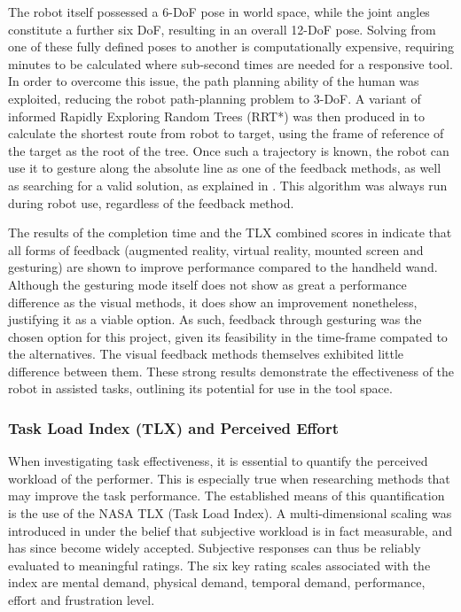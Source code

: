 \documentclass[11pt]{article}
\begin{document}
The robot itself possessed a 6-DoF pose in world space, while the joint angles constitute a further six DoF, resulting in an overall 12-DoF pose. Solving from one of these fully defined poses to another is computationally expensive, requiring minutes to be calculated where sub-second times are needed for a responsive tool. In order to overcome this issue, the path planning ability of the human was exploited, reducing the robot path-planning problem to 3-DoF. A variant of informed Rapidly Exploring Random Trees (RRT*) \cite{Gammell2014} was then produced in \cite{GreggSmithFeedback} to calculate the shortest route from robot to target, using the frame of reference of the target as the root of the tree. Once such a trajectory is known, the robot can use it to gesture along the absolute line as one of the feedback methods, as well as searching for a valid solution, as explained in \cite{GreggSmithKinematics}. This algorithm was always run during robot use, regardless of the feedback method.

The results of the completion time and the TLX combined scores in \cite{GreggSmithFeedback} indicate that all forms of feedback (augmented reality, virtual reality, mounted screen and gesturing) are shown to improve performance compared to the handheld wand. Although the gesturing mode itself does not show as great a performance difference as the visual methods, it does show an improvement nonetheless, justifying it as a viable option. As such, feedback through gesturing was the chosen option for this project, given its feasibility in the time-frame compated to the alternatives. The visual feedback methods themselves exhibited little difference between them. These strong results demonstrate the effectiveness of the robot in assisted tasks, outlining its potential for use in the tool space.
	

\subsubsection{Task Load Index (TLX) and Perceived Effort}
\label{section:tlx}

When investigating task effectiveness, it is essential to quantify the perceived workload of the performer. This is especially true when researching methods that may improve the task performance. The established means of this quantification is the use of the NASA TLX (Task Load Index). A multi-dimensional scaling was introduced in \cite{hart1988} under the belief that subjective workload is in fact measurable, and has since become widely accepted. Subjective responses can thus be reliably evaluated to meaningful ratings. The six key rating scales associated with the index are mental demand, physical demand, temporal demand, performance, effort and frustration level. 
\end{document}

